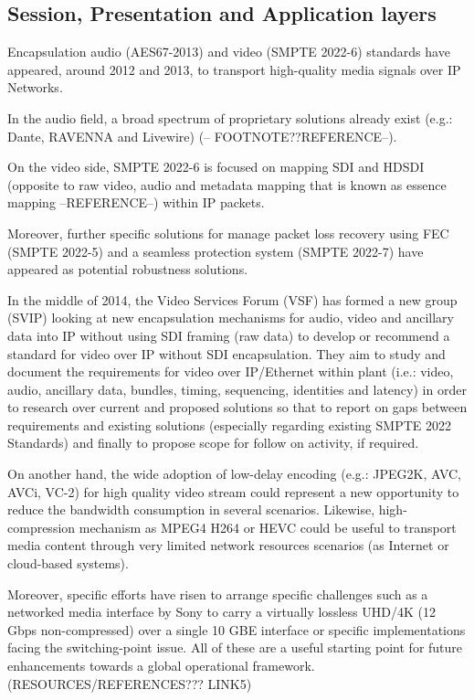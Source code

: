 \subsection{Session, Presentation and Application layers}\label{S:sessionPresentationApplicatio}

Encapsulation audio (AES67-2013) and video (SMPTE 2022-6) standards have appeared, around 2012 and 2013, to transport high-quality media signals over IP Networks.

In the audio field, a broad spectrum of proprietary solutions already exist (e.g.: Dante, RAVENNA and Livewire) (-- FOOTNOTE??REFERENCE--).

On the video side, SMPTE 2022-6 is focused on mapping SDI and HDSDI (opposite to raw video, audio and metadata mapping that is known as essence mapping --REFERENCE--) within IP packets.

Moreover, further specific solutions for manage packet loss recovery using FEC (SMPTE 2022-5) and a seamless protection system (SMPTE 2022-7) have appeared as potential robustness solutions.

In the middle of 2014, the Video Services Forum (VSF) has formed a new group (SVIP) looking at new encapsulation mechanisms for audio, video and ancillary data into IP without using SDI framing (raw data) to develop or recommend a standard for video over IP without SDI encapsulation.
They aim to study and document the requirements for video over IP/Ethernet within plant (i.e.: video, audio, ancillary data, bundles, timing, sequencing, identities and latency) in order to research over current and proposed solutions so that to report on gaps between requirements and existing solutions (especially regarding existing SMPTE 2022 Standards) and finally to propose scope for follow on activity, if required.

On another hand, the wide adoption of low-delay encoding (e.g.: JPEG2K, AVC, AVCi, VC-2) for high quality video stream could represent a new opportunity to reduce the bandwidth consumption in several scenarios. Likewise, high-compression mechanism as MPEG4 H264 or HEVC could be
useful to transport media content through very limited network resources scenarios (as Internet or cloud-based systems).

Moreover, specific efforts have risen to arrange specific challenges such as a networked media interface by Sony to carry a virtually lossless UHD/4K (12 Gbps non-compressed) over a single 10 GBE interface or specific implementations facing the switching-point issue. All of these are a useful starting point for future enhancements towards a global operational framework. (RESOURCES/REFERENCES??? LINK5)

